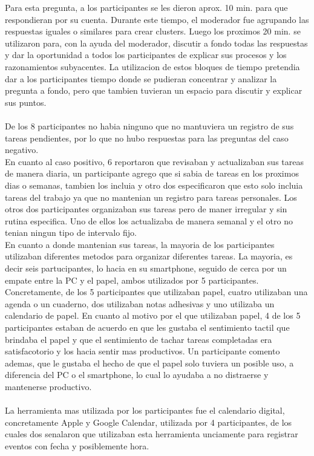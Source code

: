 Para esta pregunta, a los participantes se les dieron aprox. 10 min. para que respondieran por su cuenta. Durante este tiempo, el moderador fue agrupando las respuestas iguales o similares para crear clusters.  Luego los proximos 20 min. se utilizaron para, con la ayuda del moderador, discutir a fondo todas las respuestas y dar la oportunidad a todos los participantes de explicar sus procesos y los razonamientos subyacentes. La utilizacion de estos bloques de tiempo pretendia dar a los participantes tiempo donde se pudieran concentrar y analizar la pregunta a fondo, pero que tambien tuvieran un espacio para discutir y explicar sus puntos.\\
\\
De los 8 participantes no habia ninguno que no mantuviera un registro de sus tareas pendientes, por lo que no hubo respuestas para las preguntas del caso negativo. \\
En cuanto al caso positivo, 6 reportaron que revisaban y actualizaban sus tareas de manera diaria, un participante agrego que si sabia de tareas en los proximos dias o semanas, tambien los incluia y otro dos especificaron que esto solo incluia tareas del trabajo ya que no mantenian un registro para tareas personales. Los otros dos participantes organizaban sus tareas pero de maner irregular y sin rutina especifica. Uno de ellos los actualizaba de manera semanal y el otro no tenian ningun tipo de intervalo fijo.\\
En cuanto a donde mantenian sus tareas, la mayoria de los participantes utilizaban diferentes metodos para organizar diferentes tareas. La mayoria, es decir seis partucipantes, lo hacia en su smartphone, seguido de cerca por un empate entre la PC y el papel, ambos utilizados por 5 participantes. Concretamente, de los 5 participantes que utilizaban papel, cuatro utilizaban una agenda o un cuaderno, dos utilizaban notas adhesivas y uno utilizaba un calendario de papel. En cuanto al motivo por el que utilizaban papel, 4 de los 5 participantes estaban de acuerdo en que les gustaba el sentimiento tactil que brindaba el papel y que el sentimiento de tachar tareas completadas era satisfacotorio y los hacia sentir mas productivos. Un participante comento ademas, que le gustaba el hecho de que el papel solo tuviera un posible uso, a diferencia del PC o el smartphone, lo cual lo ayudaba a no distraerse y mantenerse productivo. 
\\
\\
La herramienta mas utilizada por los participantes fue el calendario digital, concretamente Apple y Google Calendar, utilizada por 4 participantes, de los cuales dos senalaron que utilizaban esta herramienta unciamente para registrar eventos con fecha y posiblemente hora.\\
